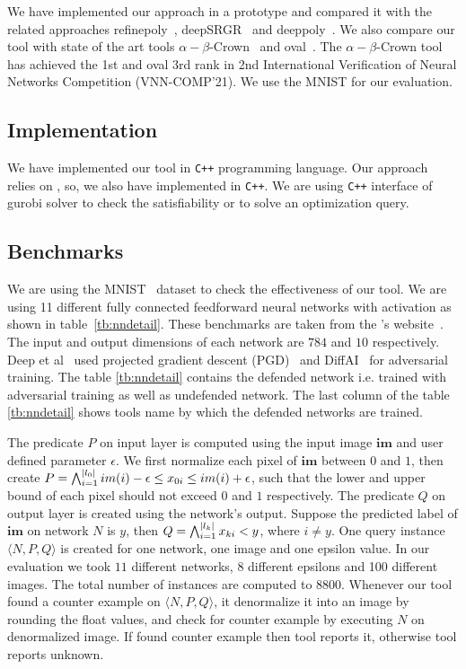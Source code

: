 We have implemented our approach in a prototype and compared it with the related 
approaches refinepoly~\cite{refinepoly}, deepSRGR~\cite{deepsrgr} and deeppoly~\cite{deeppoly}. We also compare 
our tool with state of the art tools $\alpha - \beta$-Crown~\cite{alphabetacrown} and oval~\cite{ovaltool}. 
The $\alpha - \beta$-Crown tool has achieved the 1st and oval 3rd rank in
2nd International Verification of Neural Networks Competition (VNN-COMP'21). 
We use the MNIST \cite{mnistdataset} for our evaluation.    
\subsection{Implementation}
We have implemented our tool in \texttt{C++} programming language. Our approach relies on \deeppoly{}, so, 
we also have implemented \deeppoly{} in \texttt{C++}. We are using \texttt{C++} interface of gurobi solver 
to check the satisfiability or to solve an optimization query. 

\subsection{Benchmarks}
We are using the MNIST~\cite{mnistdataset} dataset to check the effectiveness of our tool. 
We are using 11 different fully connected feedforward neural networks with \relu{} activation as shown in table~\ref{tb:nndetail}.
These benchmarks are taken from the \deeppoly{}'s website~\cite{erantool}. The input and output dimensions of each network 
are $784$ and $10$ respectively. Deep et al~\cite{deeppolyref} used projected gradient descent (PGD)~\cite{pgdref}
and DiffAI~\cite{diffairef} for adversarial training. The table \ref{tb:nndetail} contains the defended network i.e.
trained with adversarial training as well as undefended network. The last column of the table \ref{tb:nndetail}
shows tools name by which the defended networks are trained.  

The predicate $P$ on input layer is computed using the input image $\boldsymbol{im}$ and user defined parameter $\epsilon$. 
We first normalize each pixel of $\boldsymbol{im}$ between $0$ and $1$, then create 
$P = \bigwedge_{i=1}^{|l_0|} im(i)-\epsilon \leq x_{0i}\leq im(i)+\epsilon$, such that the lower and upper bound of each pixel
should not exceed $0$ and $1$ respectively. The predicate $Q$ on output layer is created using the network's output.    
Suppose the predicted label of $\boldsymbol{im}$ on network $N$ is $y$, then $Q = \bigwedge_{i=1}^{|l_k|} x_{ki} < y$, where $i \neq y$. 
One query instance $\langle N,P,Q \rangle$ is created for one network, one image and one epsilon value. 
In our evaluation we took $11$ different networks, 8 different epsilons and 100 different images. The 
total number of instances are computed to $8800$. Whenever our tool found a counter example on $\langle N,P,Q \rangle$,
it denormalize it into an image by rounding the float values, 
and check for counter example by executing $N$ on denormalized image.
If found counter example then tool reports it, otherwise tool reports unknown.



